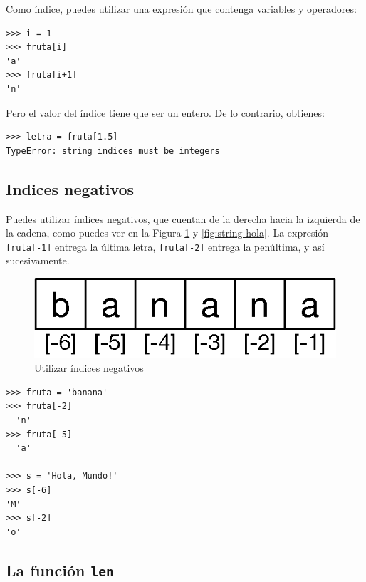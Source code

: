 
Como índice, puedes utilizar una expresión que contenga variables y
operadores:

\begin{Verbatim}[frame=single]
>>> i = 1
>>> fruta[i]
'a'
>>> fruta[i+1]
'n'
\end{Verbatim}
%

Pero el valor del índice tiene que ser un entero.  De lo contrario,
obtienes:

\begin{Verbatim}[frame=single]
>>> letra = fruta[1.5]
TypeError: string indices must be integers
\end{Verbatim}
%

\subsection{Indices negativos}

Puedes utilizar índices negativos, que cuentan de la derecha hacia la izquierda de la cadena, como puedes ver en la Figura \ref{fig:string-negativa} y \ref{fig:string-hola}. La expresión \texttt{fruta[-1]} entrega la última
letra, \texttt{fruta[-2]} entrega la penúltima, y así sucesivamente.

\begin{figure}[t]
    \centering
    \includegraphics{images/string-negatief}
    \caption{Utilizar índices negativos}
    \label{fig:string-negativa}
\end{figure}


\begin{Verbatim}[frame=single]
>>> fruta = 'banana'
>>> fruta[-2]
  'n'
>>> fruta[-5]
  'a'
  
>>> s = 'Hola, Mundo!'
>>> s[-6]
'M'
>>> s[-2]
'o'
\end{Verbatim}


\subsection{La función \texttt{len}}

